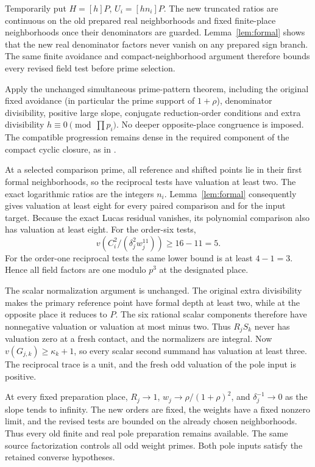 \documentclass[11pt,a4paper]{article}
\begin{document}
Temporarily put \(H=[h]P\), \(U_i=[hn_i]P\).
The new truncated ratios are continuous on the old prepared real
neighborhoods and fixed finite-place neighborhoods once their
denominators are guarded. Lemma~\ref{lem:formal} shows that the new
real denominator factors never vanish on any prepared sign branch.
The same finite avoidance and compact-neighborhood argument therefore
bounds every revised field test before prime selection.

Apply the unchanged simultaneous prime-pattern theorem, including the
original fixed avoidance (in particular the prime support of
\(1+\rho\)), denominator divisibility, positive large
slope, conjugate reduction-order conditions and extra divisibility
\(h\equiv0\pmod{\prod p_i}\). No deeper opposite-place congruence
is imposed. The compatible progression remains dense in the required
component of the compact cyclic closure, as in \cite{Unit}.

At a selected comparison prime, all reference and shifted points lie
in their first formal neighborhoods, so the reciprocal tests have
valuation at least two. The exact logarithmic ratios are the integers
\(n_i\). Lemma~\ref{lem:formal} consequently gives valuation at least
eight for every paired comparison and for the input target.
Because the exact Lucas residual vanishes, its polynomial comparison
also has valuation at least eight. For the order-six tests,
\[
 v\left(C_i^2/(\delta_j^2w_j^{11})\right)\ge16-11=5.
\]
For the order-one reciprocal tests the same lower bound is at least
\(4-1=3\). Hence all field factors are one modulo \(p^3\) at the
designated place.

The scalar normalization argument is unchanged. The original extra
divisibility makes the primary reference point have formal depth at
least two, while at the opposite place it reduces to \(P\).
The six rational scalar components therefore have nonnegative
valuation or valuation at most minus two. Thus \(R_jS_k\) never has
valuation zero at a fresh contact, and the normalizers are integral.
Now \(v(G_{j,k})\ge\kappa_k+1\), so every scalar second summand has
valuation at least three. The reciprocal trace is a unit, and the
fresh odd valuation of the pole input is positive.

At every fixed preparation place, \(R_j\to1\),
\(w_j\to\rho/(1+\rho)^2\), and \(\delta_j^{-1}\to0\) as the slope
tends to infinity. The new orders are fixed, the weights have a fixed
nonzero limit, and the revised tests are bounded on the already chosen
neighborhoods. Thus every old finite and real pole preparation remains
available. The same source factorization controls all odd weight primes.
Both pole inputs satisfy the retained converse hypotheses.
\end{document}
